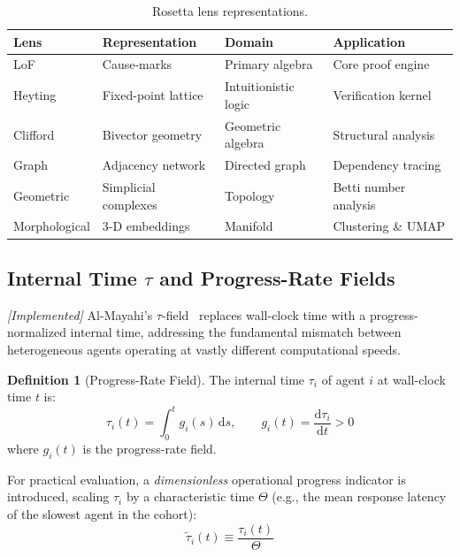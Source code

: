 \documentclass[11pt,a4paper]{article}
\theoremstyle{plain}
\theoremstyle{definition}
\newtheorem{definition}[theorem]{Definition}
\theoremstyle{remark}
\newcommand{\tauhat}{\tilde{\tau}}
\begin{document}
\begin{table}[ht]
\centering
\caption{Rosetta lens representations.}
\label{tab:rosetta}
\begin{tabular}{@{}llll@{}}
\toprule
\textbf{Lens} & \textbf{Representation} & \textbf{Domain} & \textbf{Application} \\
\midrule
LoF         & Cause-marks         & Primary algebra     & Core proof engine \\
Heyting     & Fixed-point lattice & Intuitionistic logic & Verification kernel \\
Clifford    & Bivector geometry   & Geometric algebra   & Structural analysis \\
Graph       & Adjacency network   & Directed graph      & Dependency tracing \\
Geometric   & Simplicial complexes& Topology            & Betti number analysis \\
Morphological & 3-D embeddings    & Manifold            & Clustering \& UMAP \\
\bottomrule
\end{tabular}
\end{table}

\subsection{Internal Time \texorpdfstring{$\tau$}{tau} and Progress-Rate Fields}
\label{sec:tau}

\emph{[Implemented]} Al-Mayahi's $\tau$-field~\cite{almayahi2024,almayahi2018} replaces
wall-clock time with a progress-normalized internal time, addressing the fundamental mismatch
between heterogeneous agents operating at vastly different computational speeds.

\begin{definition}[Progress-Rate Field]
The internal time $\tau_i$ of agent $i$ at wall-clock time $t$ is:
\begin{equation}
  \tau_i(t) = \int_0^t g_i(s)\,\mathrm{d}s, \qquad g_i(t) = \frac{\mathrm{d}\tau_i}{\mathrm{d}t} > 0
  \label{eq:tau_integral}
\end{equation}
where $g_i(t)$ is the progress-rate field.
\end{definition}

For practical evaluation, a \emph{dimensionless} operational progress indicator is introduced,
scaling $\tau_i$ by a characteristic time $\Theta$ (e.g., the mean response latency of the
slowest agent in the cohort):
\begin{equation}
  \tauhat_i(t) \equiv \frac{\tau_i(t)}{\Theta}
  \label{eq:tauhat_def}
\end{equation}
\end{document}
